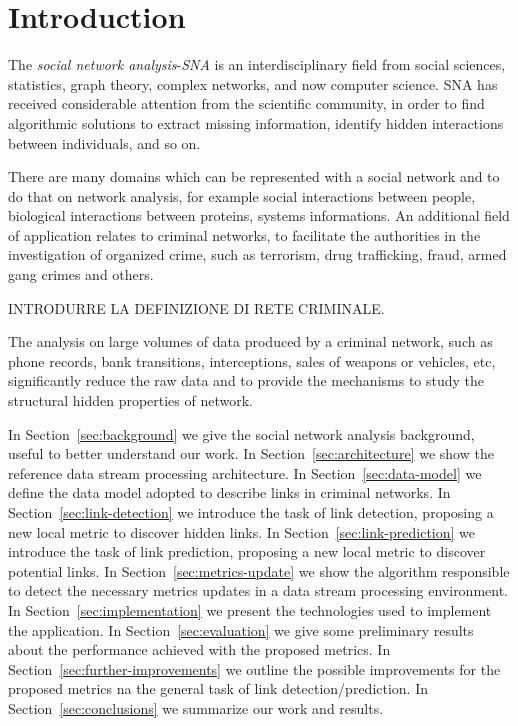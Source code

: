 \section{Introduction}
\label{sec:introduction}

The \textit{social network analysis}-\textit{SNA} is an interdisciplinary field from social sciences, statistics, graph theory, complex networks, and now computer science. SNA has received considerable attention from the scientific community, in order to find algorithmic solutions to extract missing information, identify hidden interactions between individuals, and so on.
 
There are many domains which can be represented with a social network and to do that on network analysis, for example social interactions between people, biological interactions between proteins, systems informations. An additional field of application relates to criminal networks, to facilitate the authorities in the investigation of organized crime, such as terrorism, drug trafficking, fraud, armed gang crimes and others\cite{xu2005criminal}. 

INTRODURRE LA DEFINIZIONE DI RETE CRIMINALE.

The analysis on large volumes of data produced by a criminal network, such as phone records, bank transitions, interceptions, sales of weapons or vehicles, etc, significantly reduce the raw data and to provide the mechanisms to study the structural hidden properties of network\cite{xu2005criminal}.

In Section~\ref{sec:background} we give the social network analysis background, useful to better understand our work.
In Section~\ref{sec:architecture} we show the reference data stream processing architecture.
In Section~\ref{sec:data-model} we define the data model adopted to describe links in criminal networks.
In Section~\ref{sec:link-detection} we introduce the task of link detection, proposing a new local metric to discover hidden links.
In Section~\ref{sec:link-prediction} we introduce the task of link prediction, proposing a new local metric to discover potential links.
In Section~\ref{sec:metrics-update} we show the algorithm responsible to detect the necessary metrics updates in a data stream processing environment.
In Section~\ref{sec:implementation} we present the technologies used to implement the application.
In Section~\ref{sec:evaluation} we give some preliminary results about the performance achieved with the proposed metrics.
In Section~\ref{sec:further-improvements} we outline the possible improvements for the proposed metrics na the general task of link detection/prediction.
In Section~\ref{sec:conclusions} we summarize our work and results.
